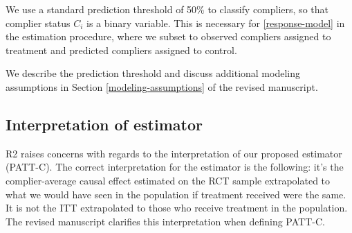 \documentclass[hidelinks,12pt,letterpaper]{article}
\begin{document}

We use a standard prediction threshold of 50\% to classify compliers, so that complier status $C_i$ is a binary variable. This is necessary for \ref{response-model} in the estimation procedure, where we subset to observed compliers assigned to treatment and predicted compliers assigned to control. 

We describe the prediction threshold and discuss additional modeling assumptions in Section \ref{modeling-assumptions} of the revised manuscript. 

\subsection{Interpretation of estimator}\label{interpret}


R2 raises concerns with regards to the interpretation of our proposed estimator (PATT-C). The correct interpretation for the estimator is the following: it's the complier-average causal effect estimated on the RCT sample extrapolated to what we would have seen in the population if treatment received were the same. It is not the ITT extrapolated to those who receive treatment in the population. The revised manuscript clarifies this interpretation when defining PATT-C. 
\end{document}
